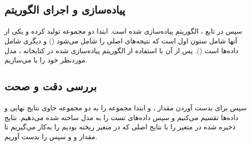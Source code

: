 \documentclass[a4paper,12pt]{article}
\begin{document}
\subsection{پیاده‌سازی و اجرای الگوریتم}
\paragraph{}
سپس در تابع ، الگوریتم  پیاده‌سازی شده است. ابتدا دو مجموعه تولید کرده و یکی از آنها شامل ستون اول است که نتیجه‌های اصلی را شامل می‌شود () و دیگری شامل داده‌ها است (). پس از آن با استفاده از الگوریتم  پیاده‌سازی شده در کتابخانه ، مدل موردنظر خود را با  می‌سازیم.
	
\subsection{بررسی دقت و صحت}
\paragraph{}
سپس برای بدست آوردن مقدار ،  و  ابتدا مجموعه  را به دو مجموعه حاوی نتایج نهایی و داده‌ها تقسیم می‌کنیم و سپس داده‌های تست را به مدل ساخته شده می‌دهیم. نتایج ذخیره شده در متغیر  را با نتایج اصلی که در متغیر  ریخته بودیم را به‌کار می‌گیریم تا مقدار  و  و سپس  را بدست آوریم.
\begin{flushleft}
\end{flushleft}
	
\end{document}
